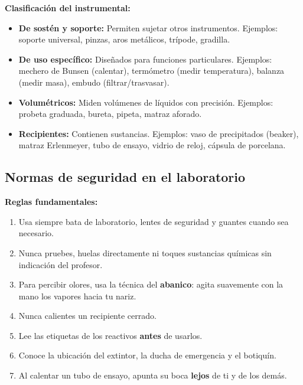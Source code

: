 \documentclass[12pt, a4paper]{article}
\begin{document}
\begin{cuadrosolucion}
\textbf{Clasificación del instrumental:}
\begin{itemize}[leftmargin=*]
  \item \textbf{De sostén y soporte:} Permiten sujetar otros instrumentos. Ejemplos: soporte universal, pinzas, aros metálicos, trípode, gradilla.
  \item \textbf{De uso específico:} Diseñados para funciones particulares. Ejemplos: mechero de Bunsen (calentar), termómetro (medir temperatura), balanza (medir masa), embudo (filtrar/trasvasar).
  \item \textbf{Volumétricos:} Miden volúmenes de líquidos con precisión. Ejemplos: probeta graduada, bureta, pipeta, matraz aforado.
  \item \textbf{Recipientes:} Contienen sustancias. Ejemplos: vaso de precipitados (beaker), matraz Erlenmeyer, tubo de ensayo, vidrio de reloj, cápsula de porcelana.
\end{itemize}
\end{cuadrosolucion}



\subsection{Normas de seguridad en el laboratorio}

\begin{cuadroextra}
\textbf{Reglas fundamentales:}
\begin{enumerate}[leftmargin=*, label=\arabic*.]
  \item Usa siempre bata de laboratorio, lentes de seguridad y guantes cuando sea necesario.
  \item Nunca pruebes, huelas directamente ni toques sustancias químicas sin indicación del profesor.
  \item Para percibir olores, usa la técnica del \textbf{abanico}: agita suavemente con la mano los vapores hacia tu nariz.
  \item Nunca calientes un recipiente cerrado.
  \item Lee las etiquetas de los reactivos \textbf{antes} de usarlos.
  \item Conoce la ubicación del extintor, la ducha de emergencia y el botiquín.
  \item Al calentar un tubo de ensayo, apunta su boca \textbf{lejos} de ti y de los demás.
\end{enumerate}
\end{cuadroextra}
\end{document}
